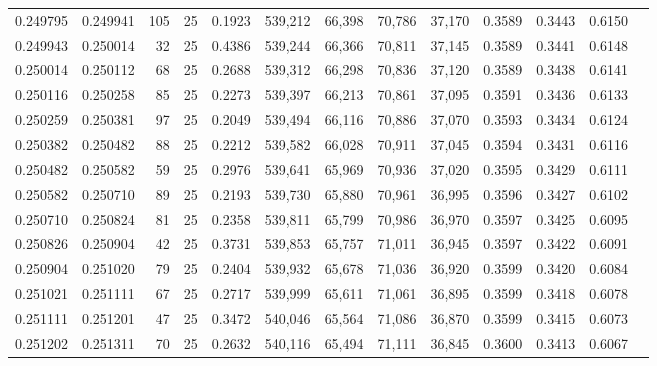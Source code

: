 \begin{tabular}{rrrrrrrrrrrrr}
0.249795 & 0.249941 &   105 &  25 &                                     0.1923 & 539,212 &  66,398 &  70,786 &  37,170 & 0.3589 & 0.3443 & 0.6150 \\
0.249943 & 0.250014 &    32 &  25 &                                     0.4386 & 539,244 &  66,366 &  70,811 &  37,145 & 0.3589 & 0.3441 & 0.6148 \\
0.250014 & 0.250112 &    68 &  25 &                                     0.2688 & 539,312 &  66,298 &  70,836 &  37,120 & 0.3589 & 0.3438 & 0.6141 \\
0.250116 & 0.250258 &    85 &  25 &                                     0.2273 & 539,397 &  66,213 &  70,861 &  37,095 & 0.3591 & 0.3436 & 0.6133 \\
0.250259 & 0.250381 &    97 &  25 &                                     0.2049 & 539,494 &  66,116 &  70,886 &  37,070 & 0.3593 & 0.3434 & 0.6124 \\
0.250382 & 0.250482 &    88 &  25 &                                     0.2212 & 539,582 &  66,028 &  70,911 &  37,045 & 0.3594 & 0.3431 & 0.6116 \\
0.250482 & 0.250582 &    59 &  25 &                                     0.2976 & 539,641 &  65,969 &  70,936 &  37,020 & 0.3595 & 0.3429 & 0.6111 \\
0.250582 & 0.250710 &    89 &  25 &                                     0.2193 & 539,730 &  65,880 &  70,961 &  36,995 & 0.3596 & 0.3427 & 0.6102 \\
0.250710 & 0.250824 &    81 &  25 &                                     0.2358 & 539,811 &  65,799 &  70,986 &  36,970 & 0.3597 & 0.3425 & 0.6095 \\
0.250826 & 0.250904 &    42 &  25 &                                     0.3731 & 539,853 &  65,757 &  71,011 &  36,945 & 0.3597 & 0.3422 & 0.6091 \\
0.250904 & 0.251020 &    79 &  25 &                                     0.2404 & 539,932 &  65,678 &  71,036 &  36,920 & 0.3599 & 0.3420 & 0.6084 \\
0.251021 & 0.251111 &    67 &  25 &                                     0.2717 & 539,999 &  65,611 &  71,061 &  36,895 & 0.3599 & 0.3418 & 0.6078 \\
0.251111 & 0.251201 &    47 &  25 &                                     0.3472 & 540,046 &  65,564 &  71,086 &  36,870 & 0.3599 & 0.3415 & 0.6073 \\
0.251202 & 0.251311 &    70 &  25 &                                     0.2632 & 540,116 &  65,494 &  71,111 &  36,845 & 0.3600 & 0.3413 & 0.6067 \\

\end{tabular}

